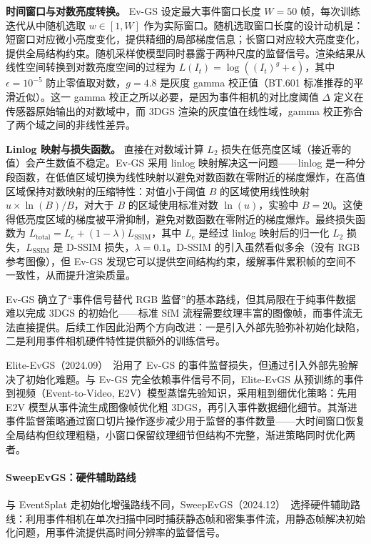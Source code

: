 \textbf{时间窗口与对数亮度转换。} Ev-GS 设定最大事件窗口长度 $W = 50$ 帧，每次训练迭代从中随机选取 $w \in [1, W]$ 作为实际窗口。随机选取窗口长度的设计动机是：短窗口对应微小亮度变化，提供精细的局部梯度信息；长窗口对应较大亮度变化，提供全局结构约束。随机采样使模型同时暴露于两种尺度的监督信号。渲染结果从线性空间转换到对数亮度空间的过程为 $L(I_t) = \log((I_t)^g + \epsilon)$，其中 $\epsilon = 10^{-5}$ 防止零值取对数，$g = 4.8$ 是灰度 gamma 校正值（BT.601 标准推荐的平滑近似）。这一 gamma 校正之所以必要，是因为事件相机的对比度阈值 $\Delta$ 定义在传感器原始输出的对数域中，而 3DGS 渲染的灰度值在线性域，gamma 校正弥合了两个域之间的非线性差异。

\textbf{Linlog 映射与损失函数。} 直接在对数域计算 $L_2$ 损失在低亮度区域（接近零的值）会产生数值不稳定。Ev-GS 采用 linlog 映射解决这一问题——linlog 是一种分段函数，在低值区域切换为线性映射以避免对数函数在零附近的梯度爆炸，在高值区域保持对数映射的压缩特性：对值小于阈值 $B$ 的区域使用线性映射 $u \times \ln(B)/B$，对大于 $B$ 的区域使用标准对数 $\ln(u)$，实验中 $B = 20$。这使得低亮度区域的梯度被平滑抑制，避免对数函数在零附近的梯度爆炸。最终损失函数为 $L_\text{total} = L_e + (1 - \lambda) L_\text{SSIM}$，其中 $L_e$ 是经过 linlog 映射后的归一化 $L_2$ 损失，$L_\text{SSIM}$ 是 D-SSIM 损失，$\lambda = 0.1$。D-SSIM 的引入虽然看似多余（没有 RGB 参考图像），但 Ev-GS 发现它可以提供空间结构约束，缓解事件累积帧的空间不一致性，从而提升渲染质量。

Ev-GS 确立了“事件信号替代 RGB 监督”的基本路线，但其局限在于纯事件数据难以完成 3DGS 的初始化——标准 SfM 流程需要纹理丰富的图像帧，而事件流无法直接提供。后续工作因此沿两个方向改进：一是引入外部先验弥补初始化缺陷，二是利用事件相机硬件特性提供额外的训练信号。

Elite-EvGS（2024.09）~\cite{2409_13392}沿用了 Ev-GS 的事件监督损失，但通过引入外部先验解决了初始化难题。与 Ev-GS 完全依赖事件信号不同，Elite-EvGS 从预训练的事件到视频（Event-to-Video, E2V）模型蒸馏先验知识，采用粗到细优化策略：先用 E2V 模型从事件流生成图像帧优化粗 3DGS，再引入事件数据细化细节。其渐进事件监督策略通过窗口切片操作逐步减少用于监督的事件数量——大时间窗口恢复全局结构但纹理粗糙，小窗口保留纹理细节但结构不完整，渐进策略同时优化两者。

\paragraph{SweepEvGS：硬件辅助路线}
与 EventSplat 走初始化增强路线不同，SweepEvGS（2024.12）~\cite{2412_11579}选择硬件辅助路线：利用事件相机在单次扫描中同时捕获静态帧和密集事件流，用静态帧解决初始化问题，用事件流提供高时间分辨率的监督信号。

